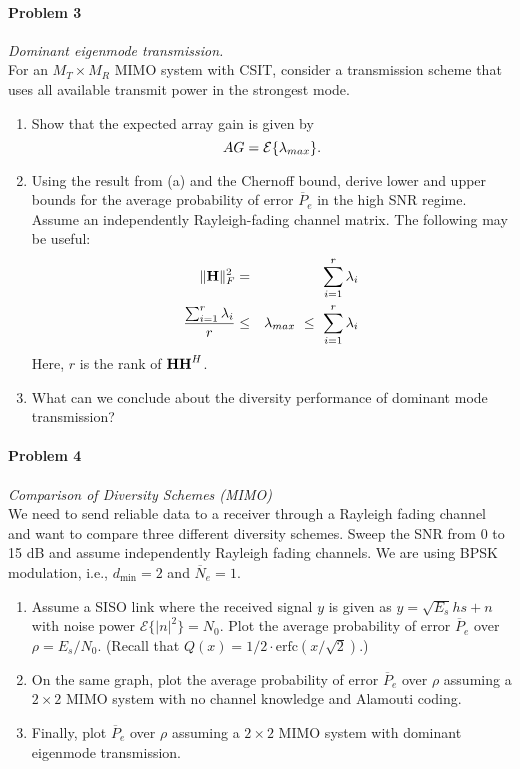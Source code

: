 \documentclass[12pt]{article}
\begin{document}
\paragraph{Problem 3}{\it Dominant eigenmode transmission.} \\
For an $M_T\times M_R$ MIMO system with CSIT, consider a transmission scheme that uses all available transmit power in the strongest mode.
\begin{enumerate} 
\item Show that the expected array gain is given by
\begin{equation*}
AG = {\cal E} \{  \lambda_{max} \}.
\end{equation*}
\item Using the result from (a) and the Chernoff bound, derive lower and upper bounds for the average probability of error $\overline P_e$ in the high SNR regime. Assume an independently  Rayleigh-fading channel matrix.  The following may be useful:
\begin{eqnarray*}
\Vert{\bf H}\Vert_F^2 &=& \sum_{i=1}^r \lambda_i \\
\frac{\sum_{i=1}^r \lambda_i}{r} &\le&  \lambda_{max} \ \le\  \sum_{i=1}^r \lambda_i\end{eqnarray*}
Here, $r$ is the rank of ${\bf H H}^H$.
\item What can we conclude about the diversity performance of dominant mode transmission?
\end{enumerate}


\paragraph{Problem 4}{\it Comparison of Diversity Schemes (MIMO)}\\
We need to send reliable data to a receiver through a Rayleigh fading channel and want to compare three different diversity schemes. Sweep the SNR from 0 to 15 dB and assume independently Rayleigh fading channels. We are using BPSK modulation, i.e., $d_\text{min} = 2$ and $\overline N_e=1$.
\begin{enumerate}
\item Assume  a SISO link where the received signal $y $ is given as
$
y = \sqrt{E_s} hs + n
$
with noise power $\mathcal E\{\vert n \vert^2 \} = N_0$.
Plot the average probability of error $\overline P_e$ over $\rho = E_s/N_0$.  (Recall that $Q(x)=1/2 \cdot \mathrm{erfc}(x / \sqrt{2})$.)
\item On the same graph, plot the average probability of error $\overline P_e$ over $\rho$ assuming a $2 \times 2$  MIMO system with no channel knowledge and  Alamouti coding. 
\item Finally, plot $\overline P_e$ over $\rho$ assuming a $2 \times 2$ MIMO system with dominant eigenmode transmission. 


\end{enumerate}
\end{document}
